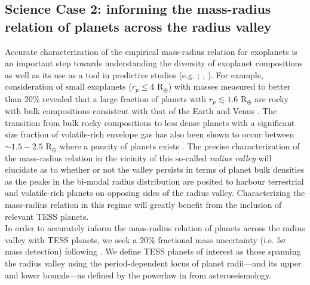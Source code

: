 \subsection{Science Case 2: informing the mass-radius relation of planets across the radius valley} \label{RVFCsect:mr}
Accurate characterization of the empirical mass-radius relation for exoplanets
\citep[e.g.][]{weiss13, rogers15, wolfgang16} is an important step towards
understanding the diversity of exoplanet compositions as well as its use as a tool in
predictive studies (e.g. ; \citealt{cloutier17a}, \citealt{cloutier18a}).
For example, consideration of small
exoplanets ($r_p \leq 4$ R$_{\oplus}$) with masses measured to better than 20\% revealed that a
large fraction of planets with $r_p \lesssim 1.6$ R$_{\oplus}$ are rocky with bulk compositions
consistent with that of the Earth and Venus \citep{dressing15b}.
The transition from bulk rocky compositions to less dense planets with a significant size fraction of
volatile-rich envelope gas has also been shown to occur
between $\sim 1.5-2.5$ R$_{\oplus}$ where a paucity of planets exists \citep{fulton17, vaneylen18}.
The precise characterization of the mass-radius relation in the vicinity of this so-called
\emph{radius valley} will elucidate as to whether or not the valley persists in terms of planet bulk
densities as the peaks in the bi-modal radius distribution are posited to harbour terrestrial and
volatile-rich planets on opposing sides of the radius valley. Characterizing the mass-radius relation
in this regime will greatly benefit from the inclusion of relevant TESS planets. \\

In order to accurately inform the mass-radius relation of planets across the radius valley 
with TESS planets, we seek a 20\% fractional mass uncertainty (i.e. $5\sigma$ mass detection) following
\cite{dressing15b}. We define TESS planets
of interest as those spanning the radius valley using the period-dependent locus of planet radii---and
its upper and lower bounds---as defined by the powerlaw in \cite{vaneylen18} from asteroseismology. \\

